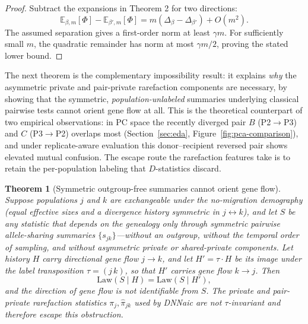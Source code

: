 \documentclass[11pt]{article}
\theoremstyle{plain}
\newtheorem{thm}{Theorem}[section]
\theoremstyle{definition}
\theoremstyle{remark}
\begin{document}
\begin{proof}
Subtract the expansions in Theorem 2 for two directions:
\[
\mathbb{E}_{\beta,m}[\Phi]-\mathbb{E}_{\beta',m}[\Phi]
=m(\Delta_\beta-\Delta_{\beta'})+O(m^2).
\]
The assumed separation gives a first-order norm at least \(\gamma m\). For sufficiently
small \(m\), the quadratic remainder has norm at most \(\gamma m/2\), proving the stated
lower bound.
\end{proof}

The next theorem is the complementary impossibility result: it explains \emph{why} the
asymmetric private and pair-private rarefaction components are necessary, by showing that the
symmetric, \emph{population-unlabeled} summaries underlying classical pairwise tests cannot
orient gene flow at all. This is the theoretical counterpart of two empirical observations: in
PC space the recently diverged pair $B$ (P2$\to$P3) and $C$ (P3$\to$P2) overlaps most
(Section~\ref{sec:eda}, Figure~\ref{fig:pca-comparison}), and under replicate-aware evaluation this donor--recipient reversed pair shows elevated mutual confusion. The escape route the rarefaction features take is to retain
the per-population labeling that $D$-statistics discard.

\begin{thm}[Symmetric outgroup-free summaries cannot orient gene flow]\label{thm:symmetric}
Suppose populations $j$ and $k$ are exchangeable under the no-migration demography (equal
effective sizes and a divergence history symmetric in $j\leftrightarrow k$), and let $S$ be
any statistic that depends on the genealogy only through symmetric pairwise allele-sharing
summaries $\{s_{jk}\}$---without an outgroup, without the temporal order of sampling, and
without asymmetric private or shared-private components. Let history $H$ carry directional
gene flow $j\to k$, and let $H'=\tau\!\cdot\! H$ be its image under the label transposition
$\tau=(j\,k)$, so that $H'$ carries gene flow $k\to j$. Then
\[
\mathrm{Law}(S\mid H)=\mathrm{Law}(S\mid H'),
\]
and the direction of gene flow is not identifiable from $S$. The private and pair-private
rarefaction statistics $\pi_j,\widehat\pi_{jk}$ used by DNNaic are not $\tau$-invariant and
therefore escape this obstruction.
\end{thm}
\end{document}
